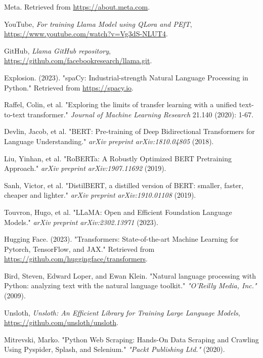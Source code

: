 \documentclass[manuscript,review,anonymous]{acmart}
\begin{document}
\begin{thebibliography}{99}
        Meta. Retrieved from \url{https://about.meta.com}.

        YouTube, \emph{For training Llama Model using QLora and PEfT}, \href{https://www.youtube.com/watch?v=Vg3dS-NLUT4}{https://www.youtube.com/watch?v=Vg3dS-NLUT4}.

        GitHub, \emph{Llama GitHub repository}, \href{https://github.com/facebookresearch/llama.git}{https://github.com/facebookresearch/llama.git}.

        Explosion. (2023). "spaCy: Industrial-strength Natural Language Processing in Python." Retrieved from \url{https://spacy.io}.

        Raffel, Colin, et al. "Exploring the limits of transfer learning with a unified text-to-text transformer." \emph{Journal of Machine Learning Research} 21.140 (2020): 1-67.

        Devlin, Jacob, et al. "BERT: Pre-training of Deep Bidirectional Transformers for Language Understanding." \emph{arXiv preprint arXiv:1810.04805} (2018).

        Liu, Yinhan, et al. "RoBERTa: A Robustly Optimized BERT Pretraining Approach." \emph{arXiv preprint arXiv:1907.11692} (2019).

        Sanh, Victor, et al. "DistilBERT, a distilled version of BERT: smaller, faster, cheaper and lighter." \emph{arXiv preprint arXiv:1910.01108} (2019).

        Touvron, Hugo, et al. "LLaMA: Open and Efficient Foundation Language Models." \emph{arXiv preprint arXiv:2302.13971} (2023).

        Hugging Face. (2023). "Transformers: State-of-the-art Machine Learning for Pytorch, TensorFlow, and JAX." Retrieved from \url{https://github.com/huggingface/transformers}.

        Bird, Steven, Edward Loper, and Ewan Klein. "Natural language processing with Python: analyzing text with the natural language toolkit." \emph{"O'Reilly Media, Inc."} (2009).

        Unsloth, \emph{Unsloth: An Efficient Library for Training Large Language Models}, \href{https://github.com/unsloth/unsloth}{https://github.com/unsloth/unsloth}.

        Mitrevski, Marko. "Python Web Scraping: Hands-On Data Scraping and Crawling Using Pyspider, Splash, and Selenium." \emph{"Packt Publishing Ltd."} (2020).


\end{thebibliography}
\end{document}
